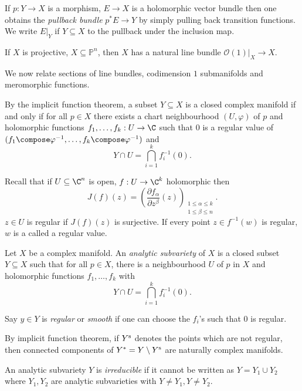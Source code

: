 \documentclass[a4paper]{article}
\renewcommand{\P}{\mathbb P} %
\begin{document}
\begin{eg}
  If \(p: Y \to X\) is a morphism, \(E \to X\) is a holomorphic vector bundle then one obtains the \emph{pullback bundle} \(p^*E \to Y\) by simply pulling back transition functions. We write \(E|_Y\) if \(Y \subseteq X\) to the pullback under the inclusion map.

  If \(X\) is projective, \(X \subseteq \P^n\), then \(X\) has a natural line bundle \(\mathcal O(1)|_X \to X\).
\end{eg}

We now relate sections of line bundles, codimension \(1\) submanifolds and meromorphic functions.

By the implicit function theorem, a subset \(Y \subseteq X\) is a closed complex manifold if and only if for all \(p \in X\) there exists a chart neighbourhood \((U, \varphi)\) of \(p\) and holomorphic functions \(f_1, \dots, f_k: U \to \C\) such that \(0\) is a regular value of \((f_1 \compose \varphi^{-1}, \dots, f_k \compose \varphi^{-1})\) and
\[
  Y \cap U = \bigcap_{i = 1}^k f_i^{-1}(0).
\]

Recall that if \(U \subseteq \C^n\) is open, \(f: U \to \C^k\) holomorphic then
\[
  J(f)(z) = \left( \frac{\partial f_\alpha}{\partial z^\beta}(z) \right)_{\substack{1 \leq \alpha \leq k \\ 1 \leq \beta \leq n}}.
\]
\(z \in U\) is regular if \(J(f)(z)\) is surjective. If every point \(z \in f^{-1}(w)\) is regular, \(w\) is a called a regular value.

\begin{definition}
  Let \(X\) be a complex manifold. An \emph{analytic subvariety} of \(X\) is a closed subset \(Y \subseteq X\) such that for all \(p \in X\), there is a neighbourhood \(U\) of \(p\) in \(X\) and holomorphic functions \(f_1, \dots, f_k\) with
  \[
    Y \cap U = \bigcap_{i = 1}^k f_i^{-1}(0).
  \]

  Say \(y \in Y\) is \emph{regular} or \emph{smooth} if one can choose the \(f_i\)'s such that \(0\) is regular.
\end{definition}

By implicit function theorem, if \(Y^{\text s}\) denotes the points which are not regular, then connected components of \(Y^* = Y \setminus Y^{\text s}\) are naturally complex manifolds.

\begin{definition}[irreducible]
  An analytic subvariety \(Y\) is \emph{irreducible} if it cannot be written as \(Y = Y_1 \cup Y_2\) where \(Y_1, Y_2\) are analytic subvarieties with \(Y \neq Y_1, Y \neq Y_2\).
\end{definition}
\end{document}
